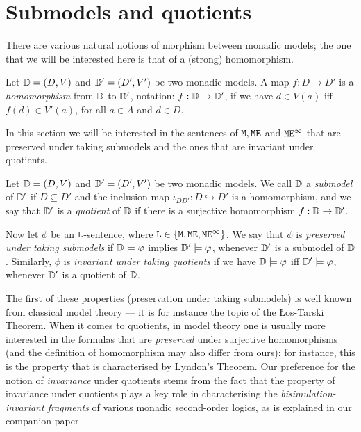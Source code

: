 
\section{Submodels and quotients}
\label{sec:inv}

There are various natural notions of morphism between monadic models; the one 
that we will be interested here is that  of a (strong) homomorphism.

\begin{definition}
\label{d:hom}
Let $\mathbb{D} = (D,V)$ and $\mathbb{D}' = (D',V')$ be two monadic models.
A map $f: D \to D'$ is a \emph{homomorphism} from $\mathbb{D}$ to $\mathbb{D}'$, 
notation: $f: \mathbb{D} \to \mathbb{D}'$, if we have $d \in V(a)$ iff $f(d) \in 
V'(a)$, for all $a \in A$ and $d \in D$.
\end{definition}

In this section we will be interested in the sentences of $\mathtt{M}, \mathtt{M}\mathtt{E}$ and 
$\mathtt{M}\mathtt{E}^{\infty}$ that are preserved under taking submodels and the ones that are 
invariant under quotients.

\begin{definition}
\label{d:inv}
Let $\mathbb{D} = (D,V)$ and $\mathbb{D}' = (D',V')$ be two monadic models.
We call $\mathbb{D}$ a \emph{submodel} of $\mathbb{D}'$ if $D \subseteq D'$ and 
the inclusion map $\iota_{DD'}: D \hookrightarrow D'$ is a homomorphism, and 
we say that $\mathbb{D}'$ is a \emph{quotient} of $\mathbb{D}$ if there 
is a surjective homomorphism $f: \mathbb{D} \to \mathbb{D}'$.

Now let $\phi$ be an $\mathtt{L}$-sentence, where $\mathtt{L} \in \{ \mathtt{M}, \mathtt{M}\mathtt{E}, \mathtt{M}\mathtt{E}^{\infty}
\}$.
We say that $\phi$ is \emph{preserved under taking submodels} if 
$\mathbb{D} \models \varphi$ implies $\mathbb{D}' \models \varphi$, whenever
$\mathbb{D}'$ is a submodel of $\mathbb{D}$.
Similarly, $\phi$ is \emph{invariant under taking quotients} if we have
$\mathbb{D} \models \varphi$ iff $\mathbb{D}' \models \varphi$, whenever $\mathbb{D}'$ is
a quotient of $\mathbb{D}$.
\end{definition}

The first of these properties (preservation under taking submodels) is well
known from classical model theory --- it is for instance the topic of the
{\L}os-Tarski Theorem.
When it comes to quotients, in model theory one is usually more interested in
the formulas that are \emph{preserved} under surjective homomorphisms (and
the definition of homomorphism may also differ from ours): for instance, this 
is the property that is characterised by Lyndon's Theorem.
Our preference for the notion of \emph{invariance} under quotients stems from 
the fact that the property of invariance under quotients plays a key role in
characterising the \emph{bisimulation-invariant fragments} of various monadic
second-order logics, as is explained in our companion paper~\cite{companionWEAK}.


